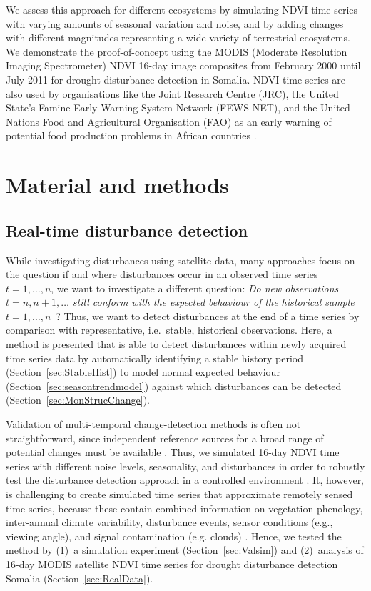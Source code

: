 \documentclass[authoryear,preprint,review,10pt]{elsarticle}
\begin{document}
We assess this approach for different ecosystems by simulating NDVI time series with varying amounts of seasonal variation and noise, and by adding changes with different magnitudes representing a wide variety of terrestrial ecosystems.  We demonstrate the proof-of-concept using the MODIS (Moderate Resolution Imaging Spectrometer) NDVI 16-day image composites from February 2000 until July 2011 for drought disturbance detection in Somalia. NDVI time series are also used by organisations like the Joint Research Centre (JRC), the United State's Famine Early Warning System Network (FEWS-NET), and the United Nations Food and Agricultural Organisation (FAO) as an early warning of potential food production problems in African countries \citep{Rojas:2005bz}.
 
\section{Material and methods}

\subsection{Real-time disturbance detection}\label{sec:Method}

While investigating disturbances using satellite data, many approaches \citep[e.g.,][]{Verbesselt:2010wo, White2009} focus on the question if and where disturbances occur in an observed time series $t = 1, \dots, n$, we want to investigate a different question: \emph{Do new observations $t = n, n + 1, \dots$ still conform with the expected behaviour of the historical sample $t = 1, \dots, n$}~? Thus, we want to detect disturbances at the end of a time series by comparison with representative, i.e.\ stable, historical observations. Here, a method is presented that is able to detect disturbances within newly acquired time series data by automatically identifying a stable history period (Section~\ref{sec:StableHist}) to model normal expected behaviour (Section~\ref{sec:seasontrendmodel}) against which disturbances can be detected (Section~\ref{sec:MonStrucChange}).

Validation of multi-temporal change-detection methods is often not straightforward, since independent reference sources for a broad range of potential changes must be available \citep{Kennedy2007}. Thus, we simulated 16-day NDVI time series with different noise levels, seasonality, and disturbances in order to robustly test the disturbance detection approach in a controlled environment \citep{Verbesselt2009a, Verbesselt:2010wo}. It, however, is challenging to create simulated time series that approximate remotely sensed time series, because these contain combined information on vegetation phenology, inter-annual climate variability, disturbance events, sensor conditions (e.g., viewing angle), and signal contamination (e.g. clouds) \citep{Zhang2009}. Hence, we tested the method by (1)~a simulation experiment (Section~\ref{sec:Valsim}) and (2)~analysis of 16-day MODIS satellite NDVI time series for drought disturbance detection Somalia (Section~\ref{sec:RealData}). 
\end{document}
